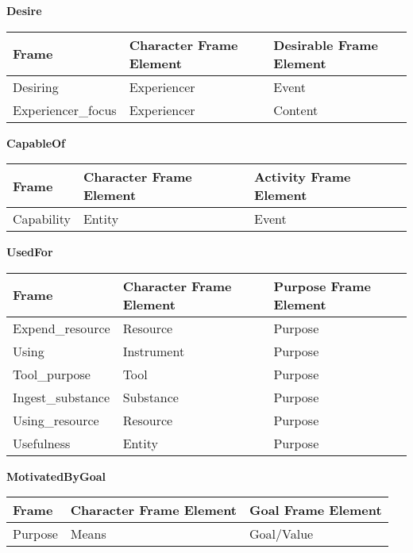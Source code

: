 \textbf{Desire}
\begin{table}[!htbp]
    \begin{tabular}{|l|l|l|}
    \hline
    \textbf{Frame}             & \textbf{Character Frame Element} & \textbf{Desirable Frame Element} \\ \hline
    Desiring          & Experiencer             & Event                   \\ \hline
    Experiencer\_focus & Experiencer             & Content                 \\ \hline
    \end{tabular}
\end{table}

\textbf{CapableOf}
\begin{table}[!htbp]
    \begin{tabular}{|l|l|l|}
    \hline
    \textbf{Frame}      & \textbf{Character Frame Element} & \textbf{Activity Frame Element} \\ \hline
    Capability & Entity                  & Event                  \\ \hline
    \end{tabular}
\end{table} 

\textbf{UsedFor}
\begin{table}[!htbp]
    \begin{tabular}{|l|l|l|}
    \hline
    \textbf{Frame}            & \textbf{Character Frame Element} & \textbf{Purpose Frame Element} \\ \hline
    Expend\_resource & Resource                & Purpose               \\ \hline
    Using            & Instrument              & Purpose               \\ \hline
    Tool\_purpose    & Tool                    & Purpose               \\ \hline
    Ingest\_substance & Substance               & Purpose               \\ \hline
    Using\_resource  & Resource                & Purpose               \\ \hline
    Usefulness       & Entity                  & Purpose               \\ \hline
    \end{tabular}
\end{table}

\textbf{MotivatedByGoal}
\begin{table}[!htbp]
    \begin{tabular}{|l|l|l|}
    \hline
    \textbf{Frame}   & \textbf{Character Frame Element} & \textbf{Goal Frame Element} \\ \hline
    Purpose & Means                   & Goal/Value         \\ \hline
    \end{tabular}
\end{table}

